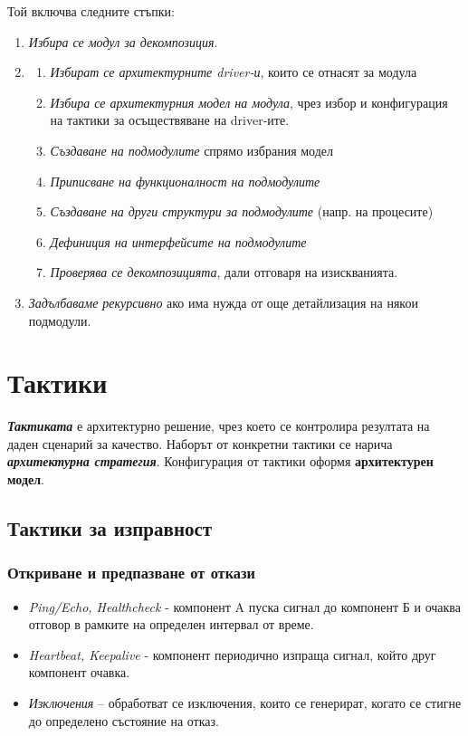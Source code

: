 \documentclass[fleqn,12pt]{article}
\begin{document}
Той включва следните стъпки:
\begin{enumerate}
    \item \textit{Избира се модул за декомпозиция}.
    \item \begin{enumerate}
        \item \textit{Избират се архитектурните driver-и}, които се отнасят за модула
        \item \textit{Избира се архитектурния модел на модула}, чрез избор и конфигурация на тактики за осъществяване на driver-ите.
        \item \textit{Създаване на подмодулите} спрямо избрания модел
        \item \textit{Приписване на функционалност на подмодулите}
        \item \textit{Създаване на други структури за подмодулите} (напр. на процесите)
        \item \textit{Дефиниция на интерфейсите на подмодулите}
        \item \textit{Проверява се декомпозицията}, дали отговаря на изискванията.
    \end{enumerate}
    \item \textit{Задълбаваме рекурсивно} ако има нужда от още детайлизация на някои подмодули.
\end{enumerate}


\section{Тактики}

\textbf{\textit{Тактиката}} е архитектурно решение, чрез което се контролира
резултата на даден сценарий за качество. Наборът от конкретни
тактики се нарича \textbf{\textit{архитектурна стратегия}}.
Конфигурация от тактики оформя \textbf{архитектурен модел}.

\subsection{Тактики за изправност}

\subsubsection{Откриване и предпазване от откази}
\begin{itemize}
\item \textit{Ping/Echo, Healthcheck} - компонент A пуска сигнал до компонент Б и очаква отговор в рамките на определен интервал от време.
\item \textit{Heartbeat, Keepalive} - компонент периодично изпраща сигнал, който друг компонент очавка.
\item \textit{Изключения} – обработват се изключения, които се генерират, когато се стигне до определено състояние на отказ.
\end{itemize}
\end{document}
